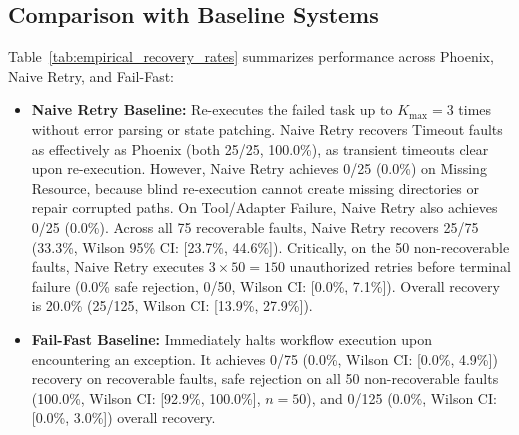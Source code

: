 \documentclass[conference]{IEEEtran}
\newcommand{\chg}[1]{{\color{blue}#1}}
\begin{document}
\subsection{\chg{Comparison with Baseline Systems}}
\chg{Table~\ref{tab:empirical_recovery_rates} summarizes performance across Phoenix, Naive Retry, and Fail-Fast:}
\begin{itemize}
    \item \chg{\textbf{Naive Retry Baseline:} Re-executes the failed task up to $K_{\text{max}} = 3$ times without error parsing or state patching. Naive Retry recovers Timeout faults as effectively as Phoenix (both 25/25, 100.0\%), as transient timeouts clear upon re-execution. However, Naive Retry achieves 0/25 (0.0\%) on Missing Resource, because blind re-execution cannot create missing directories or repair corrupted paths. On Tool/Adapter Failure, Naive Retry also achieves 0/25 (0.0\%). Across all 75 recoverable faults, Naive Retry recovers 25/75 (33.3\%, Wilson 95\% CI: [23.7\%, 44.6\%]). Critically, on the 50 non-recoverable faults, Naive Retry executes $3 \times 50 = 150$ unauthorized retries before terminal failure (0.0\% safe rejection, 0/50, Wilson CI: [0.0\%, 7.1\%]). Overall recovery is 20.0\% (25/125, Wilson CI: [13.9\%, 27.9\%]).}
    \item \chg{\textbf{Fail-Fast Baseline:} Immediately halts workflow execution upon encountering an exception. It achieves 0/75 (0.0\%, Wilson CI: [0.0\%, 4.9\%]) recovery on recoverable faults, safe rejection on all 50 non-recoverable faults (100.0\%, Wilson CI: [92.9\%, 100.0\%], $n=50$), and 0/125 (0.0\%, Wilson CI: [0.0\%, 3.0\%]) overall recovery.}
\end{itemize}
\end{document}
